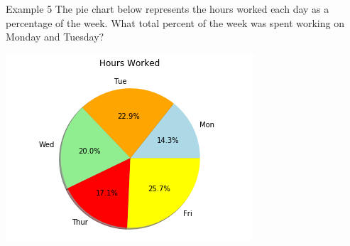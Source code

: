 \documentclass[t]{beamer}
\begin{document}
\begin{frame}{Example 5}
The pie chart below represents the hours worked each day as a percentage of the week. What total percent of the week was spent working on Monday and Tuesday?	\newline\\
\begin{minipage}{0.5\textwidth}
\includegraphics[scale=0.6]{../Images/pie.png}
\end{minipage}
\hspace{20pt}
\begin{minipage}{0.3\textwidth}
\end{minipage}
\end{frame}
\end{document}
